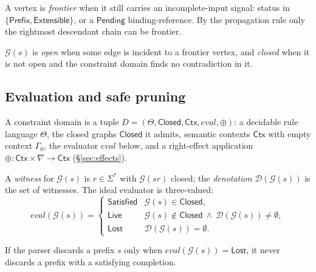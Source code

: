 A vertex is \emph{frontier} when it still carries an incomplete-input signal:
status in $\{\mathsf{Prefix}, \mathsf{Extensible}\}$, or a $\mathsf{Pending}$
binding-reference. By the propagation rule only the rightmost descendant chain
can be frontier.

\begin{definition}
  \label{def:open-closed}
  $\mathcal{G}(s)$ is \emph{open} when some edge is incident to a frontier
  vertex, and \emph{closed} when it is not open and the constraint domain finds
  no contradiction in it.
\end{definition}

\subsection{Evaluation and safe pruning}
\label{sec:eval}

\begin{definition}
  \label{def:constraint-domain}
  A constraint domain is a tuple $D = (\Theta, \mathsf{Closed}, \mathsf{Ctx},
  \mathit{eval}, \oplus)$: a decidable rule language $\Theta$, the closed graphs
  $\mathsf{Closed}$ it admits, semantic contexts $\mathsf{Ctx}$ with empty
  context $\Gamma_0$, the evaluator $\mathit{eval}$ below, and a right-effect
  application $\oplus : \mathsf{Ctx} \times \nabla \to \mathsf{Ctx}$
  (\S\ref{sec:effects}).
\end{definition}

\begin{definition}
  \label{def:eval}
  A \emph{witness} for $\mathcal{G}(s)$ is $r \in \Sigma^\ast$ with
  $\mathcal{G}(s r)$ closed; the \emph{denotation} $\mathcal{D}(\mathcal{G}(s))$
  is the set of witnesses. The ideal evaluator is three-valued:
  \[
    \mathit{eval}(\mathcal{G}(s)) =
    \begin{cases}
      \mathsf{Satisfied} & \mathcal{G}(s) \in \mathsf{Closed}, \\
      \mathsf{Live}      & \mathcal{G}(s) \notin \mathsf{Closed}
                           \ \land\ \mathcal{D}(\mathcal{G}(s)) \neq \emptyset, \\
      \mathsf{Lost}      & \mathcal{D}(\mathcal{G}(s)) = \emptyset.
    \end{cases}
  \]
\end{definition}

\begin{lemma}
  \label{lem:safe-pruning}
  If the parser discards a prefix $s$ only when $\mathit{eval}(\mathcal{G}(s)) =
  \mathsf{Lost}$, it never discards a prefix with a satisfying completion.
\end{lemma}

